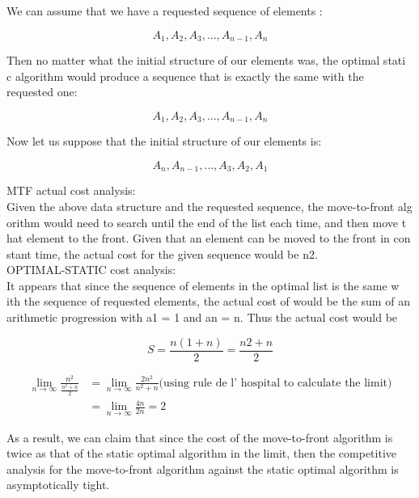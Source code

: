  
  We can assume that we have a requested sequence of elements :

$$A_{1}, A_{2}, A_{3}, … , A_{n-1}, A_{n}$$

Then no matter what the initial structure of our elements was, the optimal stati
c algorithm would produce a sequence that is exactly the same with the requested one:

$$A_{1}, A_{2}, A_{3}, … , A_{n-1}, A_{n}$$

Now let us suppose that the  initial structure of our elements is:

$$A_{n}, A_{n-1}, … , A_{3}, A_{2}, A_{1}$$

MTF actual cost analysis: \\

  Given the above data structure and the requested sequence, the move-to-front alg
orithm would need to search until the end of the list each time, and then move t
hat element to the front. Given that an element can be moved to the front in con
stant time, the actual cost for the given sequence would be n2. \\ 

OPTIMAL-STATIC cost analysis: \\

  It appears that since the sequence of elements in the optimal list is the same w
ith the sequence of requested elements, the actual cost of  would be the sum of an arithmetic progression with a1 = 1 and an = n. Thus the actual cost would be

$$
  S = \frac {n(1+n)}{2} = \frac {n2+n}{2}
$$

\begin{align*}
	\lim_{n  \to \infty} {\frac{n^{2}}{\frac{n^{2}+n}{2}}} &=\lim_{n \to \infty} {\frac{2 n^{2}}{n^{2}+n}} \text{(using rule de l' hospital to calculate the limit)} \\
	&= \lim_{n \to \infty} {\frac{4n}{2n}} = 2
\end{align*}

  As a result, we can claim that since the cost of the move-to-front algorithm is twice as that of the static optimal algorithm in the limit, then the competitive analysis for the move-to-front algorithm against the static optimal algorithm is asymptotically tight.
